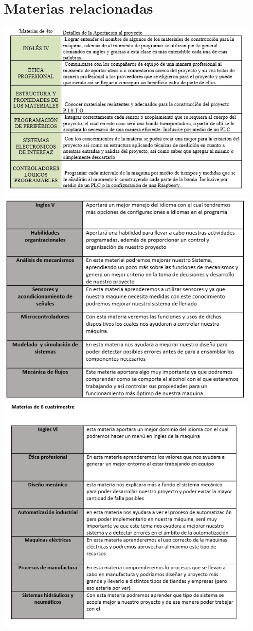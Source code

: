 \documentclass[12pt,a4paper]{report}
\begin{document}
\section{Materias relacionadas}
\includegraphics[width=16cm]{materias 2.png}  
\includegraphics[width=16cm]{Materias.png}
\newpage
\includegraphics[width=16cm]{Materias1.png} 



\end{document}
